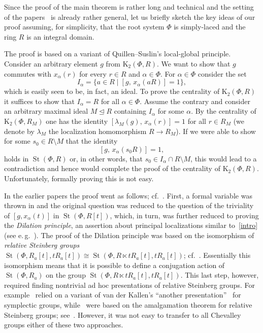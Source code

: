 \documentclass[oneside, 11pt]{amsart}
\numberwithin{equation}{section}
\theoremstyle{definition}
\theoremstyle{remark}
\DeclareMathOperator\St{St}
\begin{document}
Since the proof of the main theorem is rather long and technical and the setting of the papers~\cite{Vor1,Vor2} is already rather general, let us briefly sketch the key ideas of our proof assuming, for simplicity, that the root system $\Phi$ is simply-laced and the ring $R$ is an integral domain.

The proof is based on a variant of Quillen--Suslin's local-global principle.
Consider an arbitrary element $g$ from $\mathrm K_{2}(\Phi, R)$. We want to show that $g$ commutes with $x_{\alpha}(r)$ for every $r\in R$ and $\alpha\in\Phi$.
For $\alpha \in \Phi$ consider the set \[I_\alpha=\{a\in R\mid [g,\,x_{\alpha}(aR)]=1\},\] which is easily seen to be, in fact, an ideal.
To prove the centrality of $\mathrm{K}_{2}(\Phi, R)$ it suffices to show that $I_\alpha=R$ for all $\alpha\in \Phi$.
Assume the contrary and consider an arbitrary maximal ideal $M \trianglelefteq R$ containing $I_\alpha$ for some $\alpha$. 
By the centrality of $\mathrm K_{2}(\Phi, R_M)$ one has the identity $[\lambda_{M}(g),\,x_{\alpha}(r)]=1$ for all $r\in R_{M}$ (we denote by $\lambda_M$ the localization homomorphism $R \to R_M$). 
If we were able to show for some $s_0\in R\setminus M$ that the identity \begin{equation} \label{intro} [g,\,x_{\alpha}(s_0R)]=1, \end{equation} holds in $\St(\Phi, R)$ or, in other words, that $s_0\in I_\alpha\cap R\setminus M$, this would lead to a contradiction and hence would complete the proof of the centrality of $\mathrm K_{2}(\Phi, R)$. Unfortunately, formally proving this is not easy. 

In the earlier papers the proof went as follows; cf.~\cite{Tul,Sin,LavSin,Lavlgp}.
First, a formal variable was thrown in and the original question was reduced to the question of the triviality of $[g, x_{\alpha}(t)]$ in $\St(\Phi, R[t])$, which, in turn, was further reduced to proving the {\it Dilation principle}, an assertion about principal localizations similar to~\eqref{intro} (see e.\,g.~\cite[Lemma~15]{Sin}). The proof of the Dilation principle was based on the isomorphism of {\it relative Steinberg groups} $\St(\Phi, R_a[t], tR_a[t]) \cong \St(\Phi, R \ltimes tR_a[t], tR_a[t])$; cf.~\cite[Remark~3.12]{Sin}. Essentially this isomorphism means that it is possible to define a conjugation action of $\St(\Phi, R_a)$ on the group $\St(\Phi, R\ltimes tR_a[t], tR_a[t])$.
This last step, however, required finding nontrivial ad hoc presentations of relative Steinberg groups.
For example~\cite{Lavlgp} relied on a variant of van der Kallen's ``another presentation''~\cite{vdK} for symplectic groups, while~\cite{Sin, LavSin} were based on the amalgamation theorem for relative Steinberg groups; see~\cite[Theorem~9]{Sin}. However, it was not easy to transfer to all Chevalley groups either of these two approaches.
\end{document}
